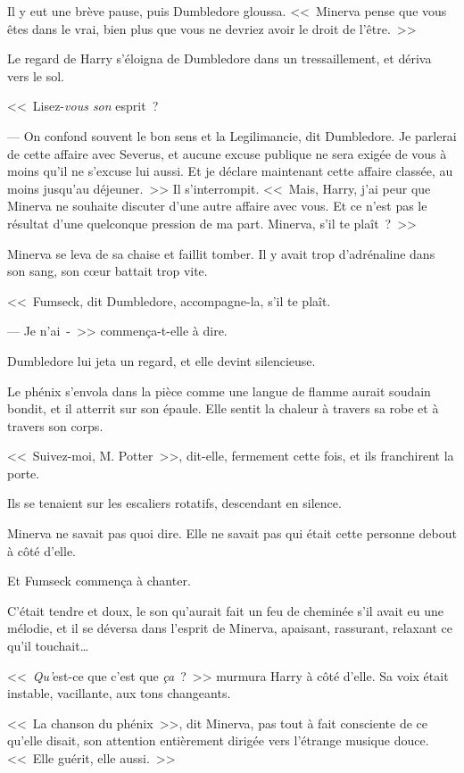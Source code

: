 Il y eut une brève pause, puis Dumbledore gloussa. <<~Minerva pense que vous êtes dans le vrai, bien plus que vous ne devriez avoir le droit de l'être.~>>

Le regard de Harry s'éloigna de Dumbledore dans un tressaillement, et dériva vers le sol.

<<~Lisez-\emph{vous son} esprit~?

--- On confond souvent le bon sens et la Legilimancie, dit Dumbledore. Je parlerai de cette affaire avec Severus, et aucune excuse publique ne sera exigée de vous à moins qu'il ne s'excuse lui aussi. Et je déclare maintenant cette affaire classée, au moins jusqu'au déjeuner.~>> Il s'interrompit. <<~Mais, Harry, j'ai peur que Minerva ne souhaite discuter d'une autre affaire avec vous. Et ce n'est pas le résultat d'une quelconque pression de ma part. Minerva, s'il te plaît~?~>>

Minerva se leva de sa chaise et faillit tomber. Il y avait trop d'adrénaline dans son sang, son cœur battait trop vite.

<<~Fumseck, dit Dumbledore, accompagne-la, s'il te plaît.

--- Je n'ai~-~>> commença-t-elle à dire.

Dumbledore lui jeta un regard, et elle devint silencieuse.

Le phénix s'envola dans la pièce comme une langue de flamme aurait soudain bondit, et il atterrit sur son épaule. Elle sentit la chaleur à travers sa robe et à travers son corps.

<<~Suivez-moi, M. Potter~>>, dit-elle, fermement cette fois, et ils franchirent la porte.

\later

Ils se tenaient sur les escaliers rotatifs, descendant en silence.

Minerva ne savait pas quoi dire. Elle ne savait pas qui était cette personne debout à côté d'elle.

Et Fumseck commença à chanter.

C'était tendre et doux, le son qu'aurait fait un feu de cheminée s'il avait eu une mélodie, et il se déversa dans l'esprit de Minerva, apaisant, rassurant, relaxant ce qu'il touchait…

<<~\emph{Qu'}est-ce que c'est que \emph{ça}~?~>> murmura Harry à côté d'elle. Sa voix était instable, vacillante, aux tons changeants.

<<~La chanson du phénix~>>, dit Minerva, pas tout à fait consciente de ce qu'elle disait, son attention entièrement dirigée vers l'étrange musique douce. <<~Elle guérit, elle aussi.~>>


